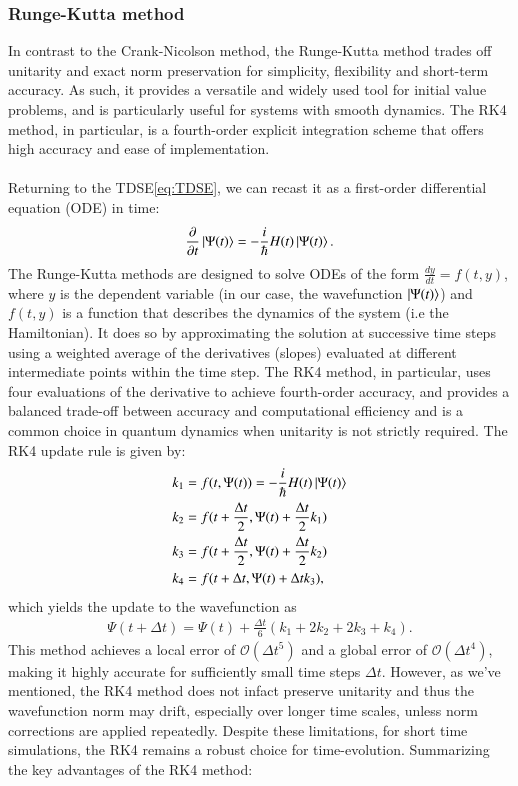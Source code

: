 \documentclass{subfiles}
\begin{document}
\subsubsection{Runge-Kutta method}
In contrast to the Crank-Nicolson method, the Runge-Kutta method trades off unitarity and exact norm preservation for simplicity, flexibility and short-term accuracy. As such, it provides a versatile and widely used tool for initial value problems, and is particularly useful for systems with smooth dynamics. The RK4 method, in particular, is a fourth-order explicit integration scheme that offers high accuracy and ease of implementation.
\\\\
Returning to the TDSE\eqref{eq:TDSE}, we can recast it as a first-order differential equation (ODE) in time:
\begin{align*}
    \frac{\partial}{\partial t}\ket{\Psi(t)} = -\frac{i}{\hbar}H(t)\ket{\Psi(t)}.
\end{align*}
The Runge-Kutta methods are designed to solve ODEs of the form $\frac{dy}{dt} = f(t, y)$, where $y$ is the dependent variable (in our case, the wavefunction $\ket{\Psi(t)}$) and $f(t, y)$ is a function that describes the dynamics of the system (i.e the Hamiltonian). It does so by approximating the solution at successive time steps using a weighted average of the derivatives (slopes) evaluated at different intermediate points within the time step. The RK4 method, in particular, uses four evaluations of the derivative to achieve fourth-order accuracy, and provides a balanced trade-off between accuracy and computational efficiency and is a common choice in quantum dynamics when unitarity is not strictly required. The RK4 update rule is given by:
\begin{align*}
    k_1 &= f(t, \Psi(t)) = -\frac{i}{\hbar}H(t)\ket{\Psi(t)} \\
    k_2 &= f(t + \frac{\Delta t}{2}, \Psi(t) + \frac{\Delta t}{2}k_1) \\
    k_3 &= f(t + \frac{\Delta t}{2}, \Psi(t) + \frac{\Delta t}{2}k_2) \\
    k_4 &= f(t + \Delta t, \Psi(t) + \Delta t k_3),
\end{align*}
which yields the update to the wavefunction as
\begin{align*}
    \Psi(t + \Delta t) = \Psi(t) + \frac{\Delta t}{6}(k_1 + 2k_2 + 2k_3 + k_4).
\end{align*}
This method achieves a local error of $\mathcal{O}(\Delta t^5)$ and a global error of $\mathcal{O}(\Delta t^4)$, making it highly accurate for sufficiently small time steps $\Delta t$. However, as we've mentioned, the RK4 method does not infact preserve unitarity and thus the wavefunction norm may drift, especially over longer time scales, unless norm corrections are applied repeatedly. Despite these limitations, for short time simulations, the RK4 remains a robust choice for time-evolution. Summarizing the key advantages of the RK4 method:
\end{document}
